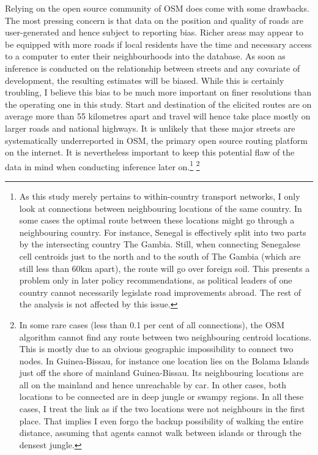 \documentclass[11pt, oneside]{article}   	%
\begin{document}
Relying on the open source community of OSM does come with some drawbacks. The most pressing concern is that data on the position and quality of roads are user-generated and hence subject to reporting bias. Richer areas may appear to be equipped with more roads if local residents have the time and necessary access to a computer to enter their neighbourhoods into the database. As soon as inference is conducted on the relationship between streets and any covariate of development, the resulting estimates will be biased. While this is certainly troubling, I believe this bias to be much more important on finer resolutions than the operating one in this study. Start and destination of the elicited routes are on average more than 55 kilometres apart and travel will hence take place mostly on larger roads and national highways. It is unlikely that these major streets are systematically underreported in OSM, the primary open source routing platform on the internet. It is nevertheless important to keep this potential flaw of the data in mind when conducting inference later on.\footnote{As this study merely pertains to within-country transport networks, I only look at connections between neighbouring locations of the same country. In some cases the optimal route between these locations might go through a neighbouring country. For instance, Senegal is effectively split into two parts by the intersecting country The Gambia. Still, when connecting Senegalese cell centroids just to the north and to the south of The Gambia (which are still less than 60km apart), the route will go over foreign soil. This presents a problem only in later policy recommendations, as political leaders of one country cannot necessarily legislate road improvements abroad. The rest of the analysis is not affected by this issue.} \footnote{In some rare cases (less than 0.1 per cent of all connections), the OSM algorithm cannot find any route between two neighbouring centroid locations. This is mostly due to an obvious geographic impossibility to connect two nodes. In Guinea-Bissau, for instance one location lies on the Bolama Islands just off the shore of mainland Guinea-Bissau. Its neighbouring locations are all on the mainland and hence unreachable by car. In other cases, both locations to be connected are in deep jungle or swampy regions. In all these cases, I treat the link as if the two locations were not neighbours in the first place. That implies I even forgo the backup possibility of walking the entire distance, assuming that agents cannot walk between islands or through the densest jungle.}
\end{document}
